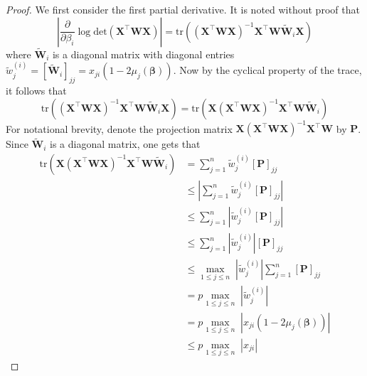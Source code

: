 \documentclass[11pt, a4paper]{article}
\newcommand*{\bb}{\boldsymbol}
\theoremstyle{example} \newtheorem{example}{Example}[section]
\theoremstyle{theorem} \newtheorem{theorem}{Theorem}[section]
\theoremstyle{theorem }\newtheorem{proposition}{Proposition}[section]
\theoremstyle{theorem }\newtheorem{corollary}{Corollary}[section]
\def\\bbeta{\bb{\\bbeta}}
\begin{document}
\begin{proof}
We first consider the first partial derivative. It is noted without proof that 
\begin{equation}
\label{eq:jeffrey_deriv_proof}
\left|\frac{\partial }{\partial \beta_i}\log \textrm{det}(\bb X^\top\bb W\bb X)\right|  = \text{tr}\left( (\bb X^\top\bb W\bb X)^{-1}\bb X^\top\bb W\widetilde{\bb W}_i\bb X \right)
\end{equation}
where $\widetilde{\bb W}_i$ is a diagonal matrix with diagonal entries $\widetilde{w}^{(i)}_{j}=[\widetilde{\bb W}_i]_{jj}   = x_{ji}(1-2\mu_j(\bb\beta))$. 
Now by the cyclical property of the trace, it follows that 
\begin{equation}
\text{tr}\left( (\bb X^\top\bb W\bb X)^{-1}\bb X^\top\bb W\widetilde{\bb W}_i\bb X \right) =\text{tr}\left( \bb X(\bb X^\top\bb W\bb X)^{-1}\bb X^\top\bb W\widetilde{\bb W}_i \right)
\end{equation}
For notational brevity, denote the projection matrix $\bb X(\bb X^\top\bb W\bb X)^{-1}\bb X^\top\bb W$ by $\bb P$. Since $\widetilde{\bb W}_i$ is a diagonal matrix, one gets that 
\begin{align} \label{eq:jeffrey_first_line}
\text{tr}\left( \bb X(\bb X^\top\bb W\bb X)^{-1}\bb X^\top\bb W\widetilde{\bb W}_i \right) &= \sum_{j=1}^{n}\widetilde{w}_j^{(i)}[\bb P]_{jj} \\ 
&\leq \left| \sum_{j=1}^{n}\widetilde{w}_j^{(i)}[\bb P]_{jj} \right| \\ 
&\leq \sum_{j=1}^{n}\left|\widetilde{w}_j^{(i)}[\bb P]_{jj} \right| \\ 
&\leq \sum_{j=1}^{n}\left|\widetilde{w}_j^{(i)}\right|[\bb P]_{jj}  \\ 
&\leq \underset{1\leq j \leq n}{\max}\; \left|\widetilde{w}_j^{(i)}\right| \sum_{j=1}^{n}[\bb P]_{jj}  \\ 
&=p \underset{1\leq j \leq n}{\max}\; \left|\widetilde{w}_j^{(i)}\right|\\ 
&=p \underset{1\leq j \leq n}{\max}\; \left|x_{ji}(1-2\mu_j(\bb\beta))\right| \\ 
&\leq p\underset{1\leq j \leq n}{\max}\;\left|x_{ji}\right|  \label{eq:jeffrey_last_line}
\end{align}

\end{proof}
\end{document}
